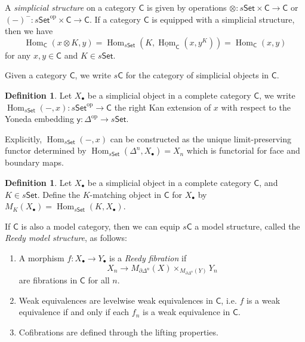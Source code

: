 \documentclass[12pt]{amsart}
\theoremstyle{definition}
\newtheorem{defn}[thm]{Definition}
\theoremstyle{remark}
\numberwithin{equation}{section}
\newcommand{\del}{\partial}
\renewcommand{\del}{\partial}
\newcommand{\CC}{{\mathsf C}}
\newcommand{\1}{{\mathbb{1}}}
\newcommand{\y}{\mathsf{y}}
\newcommand{\op}{\operatorname{op}}
\newcommand{\set}{\mathsf{Set}}
\newcommand{\bt}{\bullet}
\newcommand{\Hom}{\operatorname{Hom}}
\newcommand{\HOM}{\underline{\operatorname{Hom}}}
\begin{document}
    A {\it simplicial structure} on a category $\CC$ is given by operations $\otimes: s\set \times \CC \to \CC$ or $(-)^-: s\set^{\op}\times \CC \to \CC$. If a category $\CC$ is equipped with a simplicial structure, then we have
    \begin{equation*}
        \Hom_{\CC}(x\otimes K,y) = \Hom_{s\set}(K,\HOM_{\CC}(x,y^K)) = \Hom_{\CC}(x,y)
    \end{equation*}
    for any $x,y \in \CC$ and $K\in s\set$.
    
    Given a category $\CC$, we write $s\CC$ for the category of simplicial objects in $\CC$.
    
    \begin{defn}
        Let $X_{\bt}$ be a simplicial object in a complete category $\CC$, we write $\Hom_{s\set}(-, x): s\set^{\op} \to \CC$ the right Kan extension of $x$ with respect to the Yoneda embedding $\y: \Delta^{\op} \to s\set$.
    \end{defn}
    Explicitly, $\Hom_{s\set}(-, x)$ can be constructed as the unique limit-preserving functor determined by $\Hom_{s\set}(\Delta^n, X_{\bt}) = X_n$ which is functorial for face and boundary maps.
    \begin{defn}
        Let $X_{\bt}$ be a simplicial object in a complete category $\CC$, and $K\in s\set$. Define the $K$-matching object in $\CC$ for $X_{\bt}$ by $M_K(X_{\bt}) = \Hom_{s\set}(K, X_{\bt})$.
    \end{defn}
    

If $\CC$ is also a model category, then we can equip $s\CC$ a model structure, called the {\it Reedy model structure}, as follows:
\begin{enumerate}
    \item A morphism $f:X_{\bt} \to Y_{\bt}$ is a {\it Reedy fibration} if
    \begin{equation*}
        X_n \to M_{\del \Delta^n}(X) \times_{M_{\del \Delta^n}(Y)} Y_n
    \end{equation*}
    are fibrations in $\CC$ for all $n$.
    \item Weak equivalences are levelwise weak equivalences in $\CC$, i.e. $f$ is a weak equivalence if and only if each $f_n$ is a weak equivalence in $\CC$.
    \item Cofibrations are defined through the lifting properties.
\end{enumerate}
\end{document}
